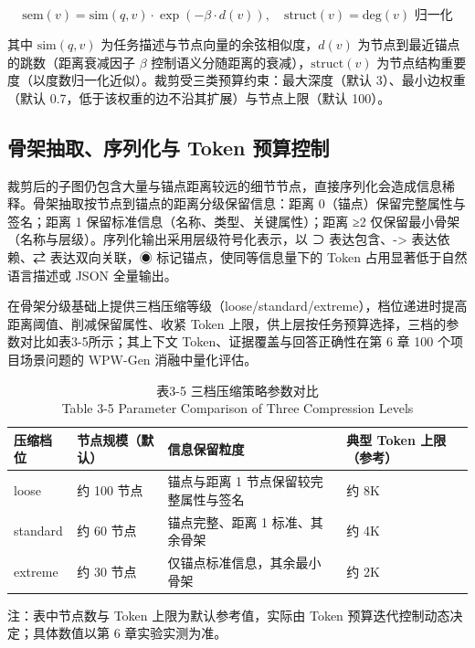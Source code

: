 \begin{equation}
\mathrm{sem}(v) = \mathrm{sim}(q, v) \cdot \exp(-\beta \cdot d(v)), \quad \mathrm{struct}(v) = \mathrm{deg}(v) \text{ 归一化} \tag{3-5}
\end{equation}

其中 $\mathrm{sim}(q,v)$ 为任务描述与节点向量的余弦相似度，$d(v)$ 为节点到最近锚点的跳数（距离衰减因子 $\beta$ 控制语义分随距离的衰减），$\mathrm{struct}(v)$ 为节点结构重要度（以度数归一化近似）。裁剪受三类预算约束：最大深度（默认 3）、最小边权重（默认 0.7，低于该权重的边不沿其扩展）与节点上限（默认 100）。


\subsection{骨架抽取、序列化与 Token 预算控制}
裁剪后的子图仍包含大量与锚点距离较远的细节节点，直接序列化会造成信息稀释。骨架抽取按节点到锚点的距离分级保留信息：距离 0（锚点）保留完整属性与签名；距离 1 保留标准信息（名称、类型、关键属性）；距离 ≥2 仅保留最小骨架（名称与层级）。序列化输出采用层级符号化表示，以 ⊃ 表达包含、-> 表达依赖、⇄ 表达双向关联，◉ 标记锚点，使同等信息量下的 Token 占用显著低于自然语言描述或 JSON 全量输出。

在骨架分级基础上提供三档压缩等级（loose/standard/extreme），档位递进时提高距离阈值、削减保留属性、收紧 Token 上限，供上层按任务预算选择，三档的参数对比如表3-5所示；其上下文 Token、证据覆盖与回答正确性在第 6 章 100 个项目场景问题的 WPW-Gen 消融中量化评估。

\begin{table}[htbp]
\centering
\small
\caption{表3-5 三档压缩策略参数对比\\Table 3-5 Parameter Comparison of Three Compression Levels}
\begin{tabularx}{\textwidth}{|X|X|X|X|}
\hline
\textbf{压缩档位} & \textbf{节点规模（默认）} & \textbf{信息保留粒度} & \textbf{典型 Token 上限（参考）} \\
\hline
loose & 约 100 节点 & 锚点与距离 1 节点保留较完整属性与签名 & 约 8K \\
standard & 约 60 节点 & 锚点完整、距离 1 标准、其余骨架 & 约 4K \\
extreme & 约 30 节点 & 仅锚点标准信息，其余最小骨架 & 约 2K \\
\hline
\end{tabularx}
\end{table}

注：表中节点数与 Token 上限为默认参考值，实际由 Token 预算迭代控制动态决定；具体数值以第 6 章实验实测为准。

